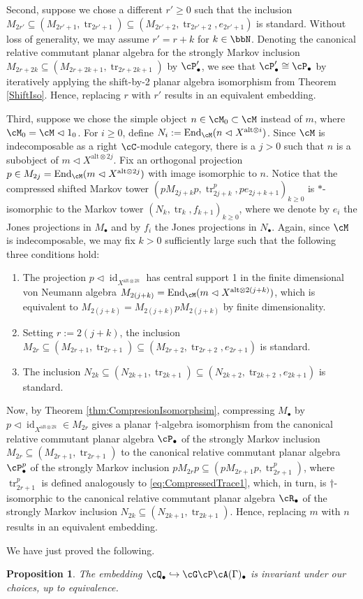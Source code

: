 \documentclass[11pt]{article}
\theoremstyle{plain}
\newtheorem{prop}[thm]{Proposition}
\theoremstyle{definition}
\DeclareMathOperator{\End}{End}
\DeclareMathOperator{\id}{id}
\DeclareMathOperator{\tr}{tr}
\begin{document}
Second, suppose we chose a different $r'\geq 0$ such that the inclusion $M_{2r'}\subseteq (M_{2r'+1}, \tr_{2r'+1})\subseteq (M_{2r'+2}, \tr_{2r'+2}, e_{2r'+1})$ is standard.
Without loss of generality, we may assume $r' = r+k$ for $k\in \bbN$.
Denoting the canonical relative commutant planar algebra for the strongly Markov inclusion $M_{2r+2k}\subseteq (M_{2r+2k+1}, \tr_{2r+2k+1})$ by $\cP_\bullet'$, we see that $\cP_\bullet'\cong \cP_\bullet$ by iteratively applying the shift-by-2 planar algebra isomorphism from Theorem \ref{ShiftIso}. 
Hence, replacing $r$ with $r'$ results in an equivalent embedding.

Third, suppose we chose the simple object $n\in \cM_0 \subset \cM$ instead of $m$, where $\cM_0 = \cM\vartriangleleft 1_0$.
For $i\geq 0$, define $N_i := \End_\cM(n \vartriangleleft X^{\text{alt}\otimes i})$.
Since $\cM$ is indecomposable as a right $\cC$-module category, there is a $j>0$ such that $n$ is a subobject of $m \vartriangleleft X^{\text{alt}\otimes 2j}$.
Fix an orthogonal projection $p \in M_{2j} = \End_\cM(m \vartriangleleft X^{\text{alt}\otimes 2j})$ with image isomorphic to $n$.
Notice that the compressed shifted Markov tower $(pM_{2j+k}p, \tr_{2j+k}^p, pe_{2j+k+1})_{k\geq 0}$ is $*$-isomorphic to the Markov tower $(N_{k}, \tr_k, f_{k+1})_{k\geq 0}$, where we denote by $e_i$ the Jones projections in $M_\bullet $ and by $f_i$ the Jones projections in $N_\bullet$.
Again, since $\cM$ is indecomposable, we may fix $k>0$ sufficiently large such that the following three conditions hold:
\begin{enumerate}[label={\rm(\arabic*)}]
\item
 The projection $p\vartriangleleft \id_{X^{\text{alt}\otimes 2k}}$ has central support 1 in the finite dimensional von Neumann algebra $M_{2(j+k)} = \End_\cM(m \vartriangleleft X^{\text{alt}\otimes 2(j+k)})$, which is equivalent to $M_{2(j+k)} = M_{2(j+k)}p M_{2(j+k)}$ by finite dimensionality.
\item
Setting $r:= 2(j+k)$, the inclusion $M_{2r} \subseteq (M_{2r+1}, \tr_{2r+1}) \subseteq (M_{2r+2}, \tr_{2r+2}, e_{2r+1})$ is standard.
\item
The inclusion $N_{2k} \subseteq (N_{2k+1}, \tr_{2k+1}) \subseteq (N_{2k+2}, \tr_{2k+2}, e_{2k+1})$ is standard.
\end{enumerate}
Now, by Theorem \ref{thm:CompresionIsomorphsim}, compressing $M_\bullet$ by $p\vartriangleleft \id_{X^{\text{alt}\otimes 2k}} \in M_{2r}$ gives a planar $\dag$-algebra isomorphism from the canonical relative commutant planar algebra $\cP_\bullet$ of the strongly Markov inclusion $M_{2r} \subseteq (M_{2r+1}, \tr_{2r+1})$ to the
canonical relative commutant planar algebra $\cP^p_\bullet$ of the strongly Markov inclusion $pM_{2r}p \subseteq (pM_{2r+1}p, \tr^p_{2r+1})$, where $\tr^p_{2r+1}$ is defined analogously to \eqref{eq:CompressedTrace1}, which, in turn, is $\dag$-isomorphic to the canonical relative commutant planar algebra $\cR_\bullet$ of the strongly Markov inclusion $N_{2k} \subseteq (N_{2k+1}, \tr_{2k+1})$.
Hence, replacing $m$ with $n$ results in an equivalent embedding.

We have just proved the following.

\begin{prop}
The embedding $\cQ_\bullet \hookrightarrow \cG\cP\cA(\Gamma)_\bullet$ is invariant under our choices, up to equivalence.
\end{prop}



{\footnotesize{

}}
\end{document}
